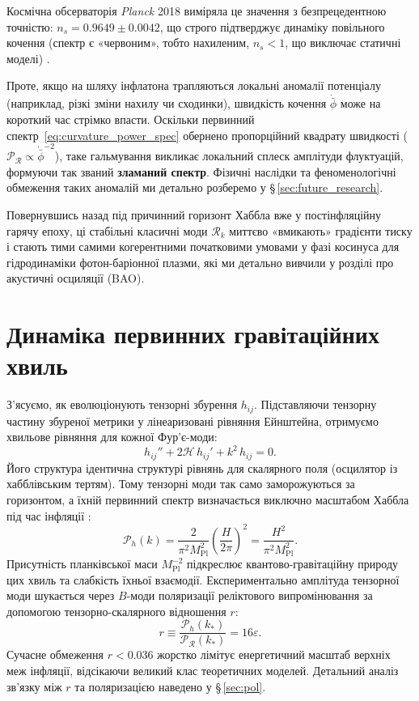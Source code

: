 Космічна обсерваторія \textit{Planck} 2018 виміряла це значення з безпрецедентною точністю: $n_s = 0.9649 \pm 0.0042$, що строго підтверджує динаміку повільного кочення (спектр є «червоним», тобто нахиленим, $n_s < 1$, що виключає статичні моделі) \cite{planck_2018}.

Проте, якщо на шляху інфлатона трапляються локальні аномалії потенціалу (наприклад, різкі зміни нахилу чи сходинки), швидкість кочення $\dot{\bar\phi}$ може на короткий час стрімко впасти. Оскільки первинний спектр~\eqref{eq:curvature_power_spec} обернено пропорційний квадрату швидкості ($\mathcal{P}_{\mathcal{R}} \propto \dot{\bar{\phi}}^{-2}$), таке гальмування викликає локальний сплеск амплітуди флуктуацій, формуючи так званий \textbf{зламаний спектр}. Фізичні наслідки та феноменологічні обмеження таких аномалій ми детально розберемо у §\,\ref{sec:future_research}.

Повернувшись назад під причинний горизонт Хаббла вже у постінфляційну гарячу епоху, ці стабільні класичні моди $\mathcal{R}_k$ миттєво «вмикають» градієнти тиску і стають тими самими когерентними початковими умовами у фазі косинуса для гідродинаміки фотон-баріонної плазми, які ми детально вивчили у розділі про акустичні осциляції (BAO).

\section{Динаміка первинних гравітаційних хвиль}

З'ясуємо, як еволюціонують тензорні збурення $h_{ij}$. Підставляючи тензорну частину збуреної метрики у лінеаризовані рівняння Ейнштейна, отримуємо хвильове рівняння для кожної Фур'є-моди:
\begin{equation}\label{eq:tensor_wave_eq}
  h_{ij}'' + 2\mathcal{H}\,h_{ij}' + k^2\,h_{ij} = 0.
\end{equation}
Його структура ідентична структурі рівнянь для скалярного поля (осцилятор із хабблівським тертям). Тому тензорні моди так само заморожуються за горизонтом, а їхній первинний спектр визначається виключно масштабом Хаббла під час інфляції \cite{starobinsky_1979}:
\begin{equation}\label{eq:tensor_power_spec}
  \mathcal{P}_h(k) = \frac{2}{\pi^2 M_\mathrm{Pl}^2} \left(\frac{H}{2\pi}\right)^{\!2} = \frac{H^2}{\pi^2 M_\mathrm{Pl}^2}.
\end{equation}
Присутність планківської маси $M_\mathrm{Pl}^{-2}$ підкреслює квантово-гравітаційну природу цих хвиль та слабкість їхньої взаємодії. Експериментально амплітуда тензорної моди шукається через $B$-моди поляризації реліктового випромінювання за допомогою тензорно-скалярного відношення $r$:
\begin{equation}\label{eq:tensor_scalar_ratio}
  r \equiv \frac{\mathcal{P}_h(k_*)}{\mathcal{P}_{\mathcal{R}}(k_*)} = 16\varepsilon.
\end{equation}
Сучасне обмеження $r < 0.036$ \cite{bicep_keck_2021} жорстко лімітує енергетичний масштаб верхніх меж інфляції, відсікаючи великий клас теоретичних моделей. Детальний аналіз зв'язку між $r$ та поляризацією наведено у §\,\ref{sec:pol}.

